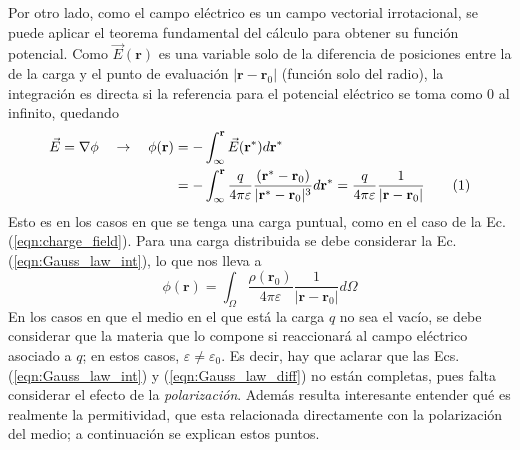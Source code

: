 \documentclass[12pt, oneside, numbers, spanish]{ezthesis}
\newcommand\numberthis{\addtocounter{equation}{1}\tag{\theequation}}
\numberwithin{equation}{section}
\begin{document}
Por otro lado, como el campo eléctrico es un campo vectorial irrotacional, se puede aplicar el teorema fundamental del cálculo para obtener su función potencial. Como $\vec{E}(\mathbf{r})$ es una variable solo de la diferencia de posiciones entre la de la carga y el punto de evaluación $|\mathbf{r} - \mathbf{r}_0|$ (función solo del radio), la integración es directa si la referencia para el potencial eléctrico se toma como $0$ al infinito, quedando
\begin{align*}
\vec{E} = \nabla\phi \quad\rightarrow\quad\phi{(\mathbf{r})} & = -\int_\infty^{\mathbf{r}} \vec{E}(\mathbf{r}^*) d\mathbf{r}^* \\
& = -\int_\infty^{\mathbf{r}} \frac{q}{4\pi\varepsilon}\frac{(\mathbf{r}^*-\mathbf{r}_0)}{|\mathbf{r}^* - \mathbf{r}_0|^3} d\mathbf{r}^* = \frac{q}{4\pi\varepsilon}\frac{1}{|\mathbf{r} - \mathbf{r}_0|}\numberthis
\end{align*}
Esto es en los casos en que se tenga una carga puntual, como en el caso de la Ec. (\ref{eqn:charge_field}). Para una carga distribuida se debe considerar la Ec. (\ref{eqn:Gauss_law_int}), lo que nos lleva a
\begin{equation}\label{eqn:integral_potential}
\phi(\mathbf{r}) = \int_\Omega \frac{\rho(\mathbf{r}_0)}{4\pi\varepsilon}\frac{1}{|\mathbf{r}-\mathbf{r}_0|}d\Omega
\end{equation}
En los casos en que el medio en el que está la carga $q$ no sea el vacío, se debe considerar que la materia que lo compone si reaccionará al campo eléctrico asociado a $q$; en estos casos, $\varepsilon \neq \varepsilon_0$. Es decir, hay que aclarar que las Ecs. (\ref{eqn:Gauss_law_int}) y (\ref{eqn:Gauss_law_diff}) no están completas, pues falta considerar el efecto de la \textit{polarización}. Además resulta interesante entender qué es realmente la permitividad, que esta relacionada directamente con la polarización del medio; a continuación se explican estos puntos.
\end{document}
